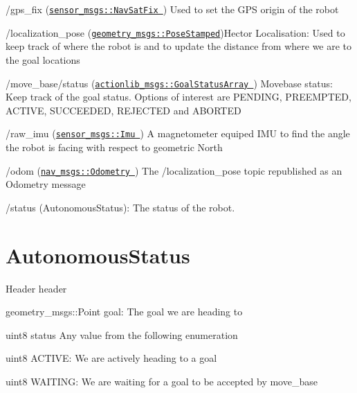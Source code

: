 \begin{DoxyItemize}
\item {\ttfamily /gps\-\_\-fix} (\href{http://ros.org/doc/api/sensor_msgs/html/msg/NavSatFix.html}{\tt sensor\-\_\-msgs\-::\-Nav\-Sat\-Fix }) \-Used to set the \-G\-P\-S origin of the robot
\item {\ttfamily /localization\-\_\-pose} (\href{http://ros.org/doc/api/geometry_msgs/html/msg/PoseStamped.html}{\tt geometry\-\_\-msgs\-::\-Pose\-Stamped})\-Hector \-Localisation\-: \-Used to keep track of where the robot is and to update the distance from where we are to the goal locations
\item {\ttfamily /move\-\_\-base/status} (\href{http://docs.ros.org/api/actionlib_msgs/html/msg/GoalStatusArray.html}{\tt actionlib\-\_\-msgs\-::\-Goal\-Status\-Array }) \-Movebase status\-: \-Keep track of the goal status. \-Options of interest are \-P\-E\-N\-D\-I\-N\-G, \-P\-R\-E\-E\-M\-P\-T\-E\-D, \-A\-C\-T\-I\-V\-E, \-S\-U\-C\-C\-E\-E\-D\-E\-D, \-R\-E\-J\-E\-C\-T\-E\-D and \-A\-B\-O\-R\-T\-E\-D
\item {\ttfamily /raw\-\_\-imu} (\href{http://ros.org/doc/api/sensor_msgs/html/msg/Imu.html}{\tt sensor\-\_\-msgs\-::\-Imu }) \-A magnetometer equiped \-I\-M\-U to find the angle the robot is facing with respect to geometric \-North
\item {\ttfamily /odom} (\href{http://ros.org/doc/api/nav_msgs/html/msg/Odometry.html}{\tt nav\-\_\-msgs\-::\-Odometry }) \-The /localization\-\_\-pose topic republished as an \-Odometry message
\item {\ttfamily /status} (\-Autonomous\-Status)\-: \-The status of the robot.
\end{DoxyItemize}\hypertarget{index_autostatus}{}\section{\-Autonomous\-Status}\label{index_autostatus}
\-Header header

geometry\-\_\-msgs\-::\-Point goal\-: \-The goal we are heading to

uint8 status \-Any value from the following enumeration


\begin{DoxyItemize}
\item uint8 \-A\-C\-T\-I\-V\-E\-: \-We are actively heading to a goal
\end{DoxyItemize}


\begin{DoxyItemize}
\item uint8 \-W\-A\-I\-T\-I\-N\-G\-: \-We are waiting for a goal to be accepted by move\-\_\-base
\end{DoxyItemize}


